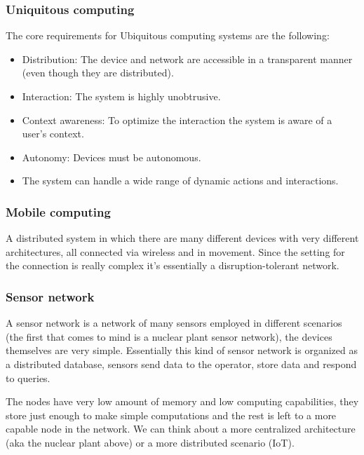 \subsubsection{Uniquitous computing}
The core requirements for Ubiquitous computing systems are the following:
\begin{itemize}
    \item Distribution: The device and network are accessible in a transparent manner (even though they are distributed).
    \item Interaction: The system is highly unobtrusive.
    \item Context awareness: To optimize the interaction the system is aware of a user's context.
    \item Autonomy: Devices must be autonomous.
    \item The system can handle a wide range of dynamic actions and interactions.
\end{itemize}
\subsubsection{Mobile computing}
A distributed system in which there are many different devices with very different architectures, all connected via wireless and in movement. Since the setting for the connection is really complex it's essentially a disruption-tolerant network.
\subsubsection{Sensor network}
A sensor network is a network of many sensors employed in different scenarios (the first that comes to mind is a nuclear plant sensor network), the devices themselves are very simple. Essentially this kind of sensor network is organized as a distributed database, sensors send data to the operator, store data and respond to queries.

The nodes have very low amount of memory and low computing capabilities, they store just enough to make simple computations and the rest is left to a more capable node in the network. We can think about a more centralized architecture (aka the nuclear plant above) or a more distributed scenario (IoT).